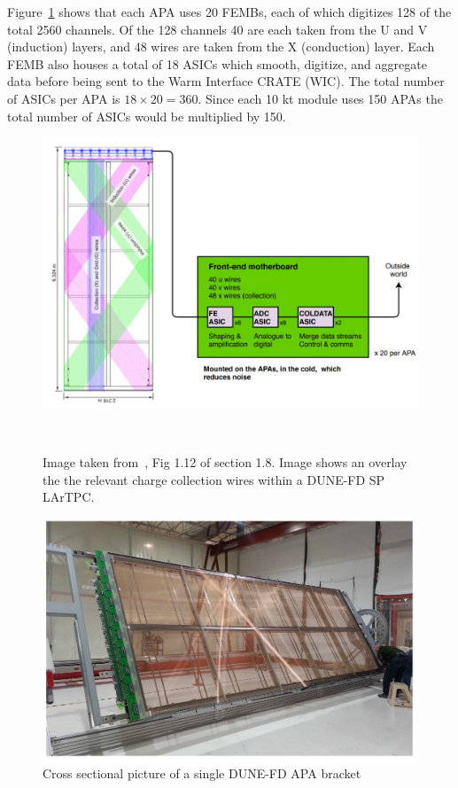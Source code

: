 Figure~\ref{fig:dune_tpc_electronics} shows that each APA uses 20 FEMBs, each of which digitizes 128 of the total 2560 channels.
Of the 128 channels 40 are each taken from the U and V (induction) layers, and 48 wires are taken from the X (conduction) layer.
Each FEMB also houses a total of 18 ASICs which smooth, digitize, and aggregate data before being sent to the Warm Interface CRATE (WIC).
The total number of ASICs per APA is $18\times 20 = 360$.
Since each 10 kt module uses 150 APAs the total number of ASICs would be multiplied by 150.

\begin{figure}[]
\centering
\includegraphics[width=\textwidth]{images/dune_apa_motherboards.jpg}
\caption{Image taken from~\citep{DUNE-FD_TDRv4:Abi_2020}, Fig 1.12 of section 1.8.
Image shows an overlay the the relevant charge collection wires within a DUNE-FD SP LArTPC.
}~\label{fig:dune_tpc_electronics}
\end{figure}

\begin{figure}[]
\centering
\includegraphics[width=\textwidth]{images/dune_fd_tdr_apa_image.jpg}
\caption{Cross sectional picture of a single DUNE-FD APA bracket~\citep{DUNE-FD_TDRv4:Abi_2020}}
\label{fig:dune_apa_tdr}
\end{figure}

